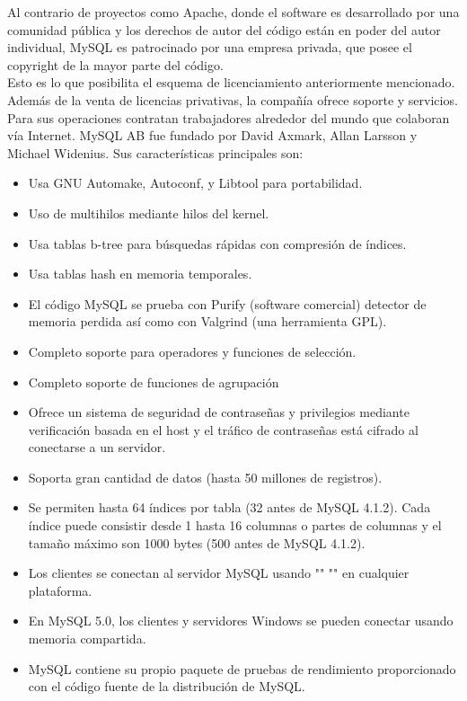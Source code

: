 Al contrario de proyectos como Apache, donde el software es desarrollado por una comunidad pública y los derechos de autor del código están en poder del autor individual, MySQL es patrocinado por una empresa privada, que posee el copyright de la mayor parte del código.\\
Esto es lo que posibilita el esquema de licenciamiento anteriormente mencionado. Además de la venta de licencias privativas, la compañía ofrece soporte y servicios. Para sus operaciones contratan trabajadores alrededor del mundo que colaboran vía Internet. MySQL AB fue fundado por David Axmark, Allan Larsson y Michael Widenius. Sus características principales son:

\begin{itemize}
\item Usa GNU Automake, Autoconf, y Libtool para portabilidad.
\item Uso de multihilos mediante hilos del kernel.
\item Usa tablas b-tree para búsquedas rápidas con compresión de índices.
\item Usa tablas hash en memoria temporales.
\item El código MySQL se prueba con Purify (software comercial) detector de memoria perdida así como con Valgrind (una herramienta GPL).
\item Completo soporte para operadores y funciones de selección.
\item Completo soporte de funciones de agrupación
\item Ofrece un sistema de seguridad de contraseñas y privilegios mediante verificación basada en el host y el tráfico de contraseñas está cifrado al conectarse a un servidor.
\item Soporta gran cantidad de datos (hasta 50 millones de registros).
\item Se permiten hasta 64 índices por tabla (32 antes de MySQL 4.1.2). Cada índice puede consistir desde 1 hasta 16 columnas o partes de columnas y el tamaño máximo son 1000 bytes (500 antes de MySQL 4.1.2).
\item Los clientes se conectan al servidor MySQL usando "" "" en cualquier plataforma.
\item En MySQL 5.0, los clientes y servidores Windows se pueden conectar usando memoria compartida.
\item MySQL contiene su propio paquete de pruebas de rendimiento proporcionado con el código fuente de la distribución de MySQL.
\end{itemize}

